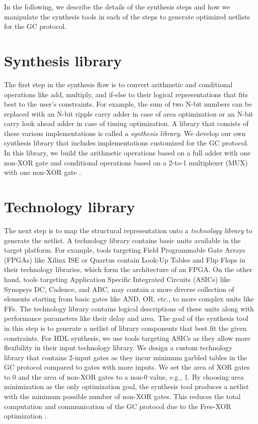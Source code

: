 In the following, we describe the details of the synthesis steps and how we manipulate the synthesis tools in each of the steps to generate optimized netlists for the GC protocol.

\section{Synthesis library}\label{sec:syn-synlib}
The first step in the synthesis flow is to convert arithmetic and conditional operations like add, multiply, and if-else to their logical representations that fits best to the user's constraints.
For example, the sum of two N-bit numbers can be replaced with an N-bit ripple carry adder in case of area optimization or an N-bit carry look ahead adder in case of timing optimization.
A library that consists of these various implementations is called a \emph{synthesis library}.
We develop our own synthesis library that includes implementations customized for the GC protocol.
In this library, we build the arithmetic operations based on a full adder with one non-XOR gate \cite{boyar2006concrete} and conditional operations based on a 2-to-1 multiplexer (MUX) with one non-XOR gate \cite{kolesnikov2008improved}.

\section{Technology library}\label{sec:syn-techlib}
The next step is to map the structural representation onto a \emph{technology library} to generate the netlist.
A technology library contains basic units available in the target platform.
For example, tools targeting Field Programmable Gate Arrays (FPGAs) like Xilinx ISE or Quartus contain Look-Up Tables and Flip Flops in their technology libraries, which form the architecture of an FPGA.
On the other hand, tools targeting Application Specific Integrated Circuits (ASICs) like Synopsys DC, Cadence, and ABC, may contain a more diverse collection of elements starting from basic gates like AND, OR, etc., to more complex units like FFs.
The technology library contains logical descriptions of these units along with performance parameters like their delay and area.
The goal of the synthesis tool in this step is to generate a netlist of library components that best fit the given constraints.
For HDL synthesis, we use tools targeting ASICs as they allow more flexibility in their input technology library.
We design a custom technology library that contains 2-input gates as they incur minimum garbled tables in the GC protocol compared to gates with more inputs.
We set the area of XOR gates to 0 and the area of non-XOR gates to a non-0 value, e.g., 1.
By choosing area minimization as the only optimization goal, the synthesis tool produces a netlist with the minimum possible number of non-XOR gates.
This reduces the total computation and communication of the GC protocol due to the Free-XOR optimization \cite{kolesnikov2008improved}.

